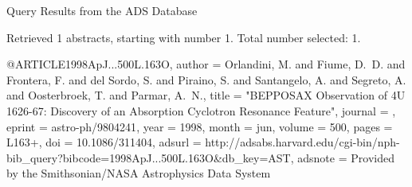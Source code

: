 Query Results from the ADS Database


Retrieved 1 abstracts, starting with number 1.  Total number selected: 1.

@ARTICLE{1998ApJ...500L.163O,
   author = {{Orlandini}, M. and {Fiume}, D.~D. and {Frontera}, F. and {del Sordo}, S. and 
	{Piraino}, S. and {Santangelo}, A. and {Segreto}, A. and {Oosterbroek}, T. and 
	{Parmar}, A.~N.},
    title = "{BEPPOSAX Observation of 4U 1626-67: Discovery of an Absorption Cyclotron Resonance Feature}",
  journal = {\apjl},
   eprint = {astro-ph/9804241},
     year = 1998,
    month = jun,
   volume = 500,
    pages = {L163+},
      doi = {10.1086/311404},
   adsurl = {http://adsabs.harvard.edu/cgi-bin/nph-bib_query?bibcode=1998ApJ...500L.163O&db_key=AST},
  adsnote = {Provided by the Smithsonian/NASA Astrophysics Data System}
}


